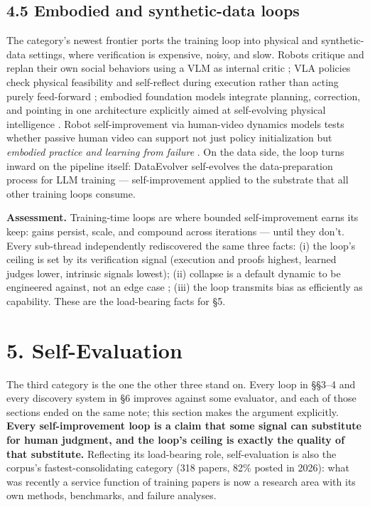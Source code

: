 \documentclass[
  11pt,
]{article}
\begin{document}
\subsection{4.5 Embodied and synthetic-data
loops}\label{embodied-and-synthetic-data-loops}

The category's newest frontier ports the training loop into physical and
synthetic-data settings, where verification is expensive, noisy, and
slow. Robots critique and replan their own social behaviors using a VLM
as internal critic \citep{lim2026robots}; VLA policies check physical
feasibility and self-reflect during execution rather than acting purely
feed-forward \citep{yang2026physreflect}; embodied foundation models
integrate planning, correction, and pointing in one architecture
explicitly aimed at self-evolving physical intelligence
\citep{yuan2026embodied}. Robot self-improvement via human-video
dynamics models tests whether passive human video can support not just
policy initialization but \emph{embodied practice and learning from
failure} \citep{chen2026robot}. On the data side, the loop turns inward
on the pipeline itself: DataEvolver self-evolves the data-preparation
process for LLM training \citep{deng2026dataevolver} ---
self-improvement applied to the substrate that all other training loops
consume.

\textbf{Assessment.} Training-time loops are where bounded
self-improvement earns its keep: gains persist, scale, and compound
across iterations --- until they don't. Every sub-thread independently
rediscovered the same three facts: (i) the loop's ceiling is set by its
verification signal (execution and proofs highest, learned judges lower,
intrinsic signals lowest); (ii) collapse is a default dynamic to be
engineered against, not an edge case \citep{lin2026self, pu2026survive};
(iii) the loop transmits bias as efficiently as capability. These are
the load-bearing facts for §5.

\section{5. Self-Evaluation}\label{self-evaluation}

The third category is the one the other three stand on. Every loop in
§§3--4 and every discovery system in §6 improves against some evaluator,
and each of those sections ended on the same note; this section makes
the argument explicitly. \textbf{Every self-improvement loop is a claim
that some signal can substitute for human judgment, and the loop's
ceiling is exactly the quality of that substitute.} Reflecting its
load-bearing role, self-evaluation is also the corpus's
fastest-consolidating category (318 papers, 82\% posted in 2026): what
was recently a service function of training papers is now a research
area with its own methods, benchmarks, and failure analyses.
\end{document}
